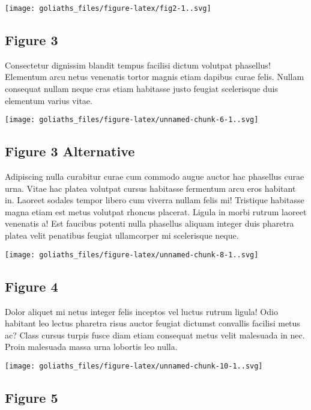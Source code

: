 \documentclass[
]{article}
\begin{document}
\texttt{[image: goliaths\_files/figure-latex/fig2-1..svg]}

\hypertarget{figure-3}{%
\subsection{Figure 3}\label{figure-3}}

Consectetur dignissim blandit tempus facilisi dictum volutpat phasellus!
Elementum arcu netus venenatis tortor magnis etiam dapibus curae felis.
Nullam consequat nullam neque cras etiam habitasse justo feugiat
scelerisque duis elementum varius vitae.

\texttt{[image: goliaths\_files/figure-latex/unnamed-chunk-6-1..svg]}

\hypertarget{figure-3-alternative}{%
\subsection{Figure 3 Alternative}\label{figure-3-alternative}}

Adipiscing nulla curabitur curae cum commodo augue auctor hac phasellus
curae urna. Vitae hac platea volutpat cursus habitasse fermentum arcu
eros habitant in. Laoreet sodales tempor libero cum viverra nullam felis
mi! Tristique habitasse magna etiam est metus volutpat rhoncus placerat.
Ligula in morbi rutrum laoreet venenatis a! Est faucibus potenti nulla
phasellus aliquam integer duis pharetra platea velit penatibus feugiat
ullamcorper mi scelerisque neque.

\texttt{[image: goliaths\_files/figure-latex/unnamed-chunk-8-1..svg]}

\hypertarget{figure-4}{%
\subsection{Figure 4}\label{figure-4}}

Dolor aliquet mi netus integer felis inceptos vel luctus rutrum ligula!
Odio habitant leo lectus pharetra risus auctor feugiat dictumst
convallis facilisi metus ac? Class cursus turpis fusce diam etiam
consequat metus velit malesuada in nec. Proin malesuada massa urna
lobortis leo nulla.

\texttt{[image: goliaths\_files/figure-latex/unnamed-chunk-10-1..svg]}

\hypertarget{figure-5}{%
\subsection{Figure 5}\label{figure-5}}
\end{document}
